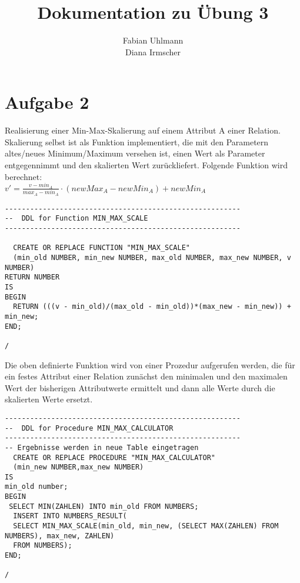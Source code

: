 \documentclass{scrartcl}
\begin{document}
\begin{titlepage}
\titlehead{Hochschule München, Fakultät 07, SoSe 2016}
\subject{Datenbanken 2}
\title{Dokumentation zu Übung 3}
\subtitle{}
\author{Fabian Uhlmann \\Diana Irmscher}
\end{titlepage}

\maketitle

\section*{Aufgabe 2}
Realisierung einer Min-Max-Skalierung auf einem Attribut A einer Relation.
Skalierung selbst ist als Funktion implementiert, die mit den Parametern altes/neues Minimum/Maximum versehen ist,
einen Wert als Parameter entgegennimmt und den skalierten Wert zurückliefert.
Folgende Funktion wird berechnet:\\
$ v' = \frac{v - min_A}{max_A - min_A}\cdot (newMax_A - newMin_A) + newMin_A $
\begin{lstlisting}
--------------------------------------------------------
--  DDL for Function MIN_MAX_SCALE
--------------------------------------------------------

  CREATE OR REPLACE FUNCTION "MIN_MAX_SCALE" 
  (min_old NUMBER, min_new NUMBER, max_old NUMBER, max_new NUMBER, v NUMBER)
RETURN NUMBER
IS
BEGIN
  RETURN (((v - min_old)/(max_old - min_old))*(max_new - min_new)) + min_new;
END;

/
\end{lstlisting}
Die oben definierte Funktion wird von einer Prozedur aufgerufen werden, die für ein festes Attribut einer Relation zunächst den minimalen und den maximalen Wert der bisherigen
Attributwerte ermittelt und dann alle Werte durch die skalierten Werte ersetzt. 
\begin{lstlisting}
--------------------------------------------------------
--  DDL for Procedure MIN_MAX_CALCULATOR
--------------------------------------------------------
-- Ergebnisse werden in neue Table eingetragen
  CREATE OR REPLACE PROCEDURE "MIN_MAX_CALCULATOR" 
  (min_new NUMBER,max_new NUMBER)
IS
min_old number;
BEGIN
 SELECT MIN(ZAHLEN) INTO min_old FROM NUMBERS;
  INSERT INTO NUMBERS_RESULT(
  SELECT MIN_MAX_SCALE(min_old, min_new, (SELECT MAX(ZAHLEN) FROM NUMBERS), max_new, ZAHLEN)
  FROM NUMBERS);
END;

/
\end{lstlisting}
\end{document}
